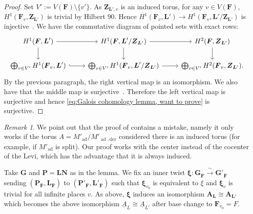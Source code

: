 \documentclass[a4paper]{amsart}
\numberwithin{equation}{section}
\theoremstyle{remark}
\newtheorem{remark}[thm]{Remark}
\theoremstyle{definition}
\DeclareMathOperator{\ad}{ad}
\newcommand{\alggrp}[1]{\underline{#1}}
\newcommand{\der}{\mathrm{der}}
\newcommand{\glob}[1]{\boldsymbol{#1}}
\newcommand{\congto}{\xrightarrow{\,\sim\,}}
\renewcommand{\o}[1]{\overline{#1}}
\begin{document}
\begin{proof}
Set $V' := V(\glob{F})\setminus\{v'\}$.
As $\glob{Z}_{\glob{L}',v}$ is an induced torus, for any $v\in V(\glob{F})$,
$H^{1}(\glob{F}_{v},\glob{Z}_{\glob{L}'})$ is trivial by Hilbert 90.
Hence $H^{1}(\glob{F}_{v},\glob{L}')\to H^{1}(\glob{F}_{v},\glob{L}'/\glob{Z}_{\glob{L}'})$ is injective~\cite[I.5.7~Proposition~42]{MR1867431}.
We have the commutative diagram of pointed sets with exact rows:
\[
\begin{tikzcd}
H^{1}(\glob{F},\glob{L}')\arrow[r]\arrow[d] &  H^{1}(\glob{F},\glob{L}'/\glob{Z}_{\glob{L}'})\arrow[d]\arrow[r] & H^{2}(\glob{F},\glob{Z}_{\glob{L}'})\arrow[d]\\
\bigoplus_{v\in V'}H^{1}(\glob{F}_{v},\glob{L}')\arrow[r,hook] & \bigoplus_{v\in V'} H^{1}(\glob{F}_{v},\glob{L}'/\glob{Z}_{\glob{L}'})\arrow[r] & \bigoplus_{v\in V'}H^{2}(\glob{F}_{v},\glob{Z}_{\glob{L}'}).
\end{tikzcd}
\]
By the previous paragraph, the right vertical map is an isomorphism.
We also have that the middle map is surjective~\cite[Proposition~1]{MR2271021}.
Therefore the left vertical map is surjective and hence \eqref{eq:Galois cohomology lemma, want to prove} is surjective.
\end{proof}

\begin{remark}
  We point out that the proof of \cite[Lemma~3.2]{MR3861809} contains a mistake, namely it only works if the torus $A = M'_{\ad}/M'_{\ad,\der}$ considered there is an induced torus (for example, if $M'_{\ad}$ is split).
  Our proof works with the center instead of the cocenter of the Levi, which has the advantage that it is always induced.
\end{remark}

Take $\glob{G}$ and $\glob{P} = \glob{L}\glob{N}$ as in the lemma.
We fix an inner twist $\glob{\xi} \colon \glob{G}_{\o{\glob F}} \congto \glob{G}'_{\o{\glob F}}$ sending $(\glob{P}_{\o{\glob F}},\glob{L}_{\o{\glob F}})$ to $(\glob{P}'_{\o{\glob F}},\glob{L}'_{\o{\glob F}})$ such that $\glob{\xi}_{v_0}$ is equivalent to $\xi$ and $\glob{\xi}_v$ is trivial for all infinite places $v$.
As above, $\glob\xi$ induces an isomorphism $\glob A_{\glob L} \cong \glob A_{\glob L'}$ which becomes the above isomorphism $\alggrp A_{\alggrp L} \cong \alggrp A_{\alggrp L'}$ after base change to $\glob F_{v_0} = F$.
\end{document}
